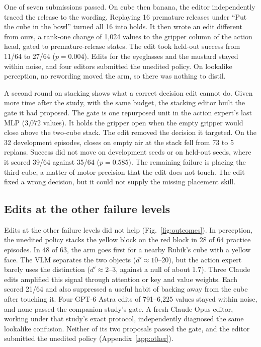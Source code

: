 \documentclass{article}
\begin{document}
One of seven submissions passed. On cube then banana, the editor independently traced the release to the wording. Replaying 16 premature releases under ``Put the cube in the bowl'' turned all 16 into holds. It then wrote an edit different from ours, a rank-one change of 1,024 values to the gripper column of the action head, gated to premature-release states. The edit took held-out success from 11/64 to 27/64 ($p=0.004$). Edits for the eyeglasses and the mustard stayed within noise, and four editors submitted the unedited policy. On lookalike perception, no rewording moved the arm, so there was nothing to distil.

A second round on stacking shows what a correct decision edit cannot do. Given more time after the study, with the same budget, the stacking editor built the gate it had proposed. The gate is one repurposed unit in the action expert's last MLP (3,072 values). It holds the gripper open when the empty gripper would close above the two-cube stack. The edit removed the decision it targeted. On the 32 development episodes, closes on empty air at the stack fell from 73 to 5 replans. Success did not move on development seeds or on held-out seeds, where it scored 39/64 against 35/64 ($p=0.585$). The remaining failure is placing the third cube, a matter of motor precision that the edit does not touch. The edit fixed a wrong decision, but it could not supply the missing placement skill.

\subsection{Edits at the other failure levels}
\label{sec:levels}
Edits at the other failure levels did not help (Fig.~\ref{fig:outcomes}). In perception, the unedited policy stacks the yellow block on the red block in 28 of 64 practice episodes. In 48 of 63, the arm goes first for a nearby Rubik's cube with a yellow face. The VLM separates the two objects ($d'\approx10$--$20$), but the action expert barely uses the distinction ($d'\approx2$--$3$, against a null of about 1.7). Three Claude edits amplified this signal through attention or key and value weights. Each scored 21/64 and also suppressed a useful habit of backing away from the cube after touching it. Four GPT-6 Astra edits of 791--6,225 values stayed within noise, and none passed the companion study's gate. A fresh Claude Opus editor, working under that study's exact protocol, independently diagnosed the same lookalike confusion. Neither of its two proposals passed the gate, and the editor submitted the unedited policy (Appendix~\ref{app:other}).
\end{document}
